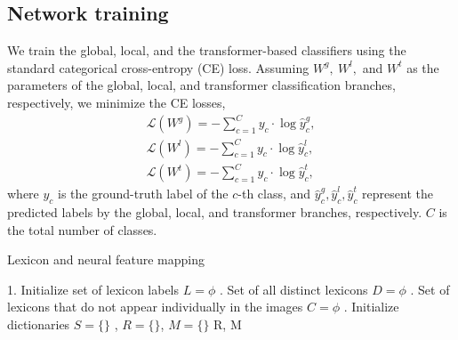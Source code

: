 \subsection{Network training}
We train the global, local, and the transformer-based classifiers using the standard categorical cross-entropy (CE) loss. Assuming $W^g,~W^l,$ and $W^t$ as the parameters of the global, local, and transformer classification branches, respectively, we minimize the CE losses,
\begin{align}
    \mathcal{L}(W^g) = - \sum_{c=1}^C y_c \cdot \log{\hat{y}_c^g} ,\\
    \mathcal{L}(W^l) = - \sum_{c=1}^C y_c \cdot \log{\hat{y}_c^l} ,\\
    \mathcal{L}(W^t) = - \sum_{c=1}^C y_c \cdot \log{\hat{y}_c^t} ,
\end{align}
where $y_c$ is the ground-truth label of the $c$-th class, and $\hat{y}_c^g, \hat{y}_c^l, \hat{y}_c^t$ represent the predicted labels by the global, local, and transformer branches, respectively. $C$ is the total number of classes. %
\begin{algorithm}[!t]
\scriptsize
	\caption{Lexicon and neural feature mapping}
	\label{algo}
	\SetAlgoLined
	1. Initialize set of lexicon labels $L=\phi$ . Set of all distinct lexicons $D=\phi$ . Set of lexicons that do not appear individually in the images $C=\phi$ . Initialize dictionaries $S=\{\}$ ,  $R=\{\}$, $M=\{\}$\;
	\KwRet R, M \;
\end{algorithm}

